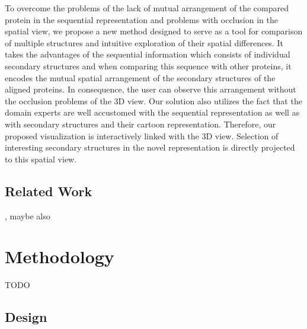 \documentclass[twocolumn]{bmcart}%
\begin{document}
To overcome the problems of the lack of mutual arrangement of the compared protein in the sequential representation and problems with occlusion in the spatial view, we propose a new method designed to serve as a tool for comparison of multiple structures and intuitive exploration of their spatial differences.
It takes the advantages of the sequential information which consists of individual secondary structures and when comparing this sequence with other proteins, it encodes the mutual spatial arrangement of the secondary structures of the aligned proteins.
In consequence, the user can observe this arrangement without the occlusion problems of the 3D view.
Our solution also utilizes the fact that the domain experts are well accustomed with the sequential representation as well as with secondary structures and their cartoon representation. 
Therefore, our proposed visualization is interactively linked with the 3D view.
Selection of interesting secondary structures in the novel representation is directly projected to this spatial view. 


\subsection*{Related Work}

\cite{Stolte2015}, maybe also \cite{Nguyen2013}

\section*{Methodology}
TODO 

\subsection*{Design}
\end{document}
